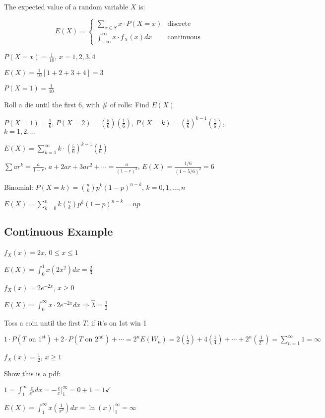 \begin{definition}
The expected value of a random variable $X$ is:

\[E(X) = \begin{cases}
\sum_{x \in S} x \cdot P(X = x) & \text{discrete} \\
\int_{-\infty}^{\infty} x \cdot f_X(x) dx & \text{continuous}
\end{cases}\]
\end{definition}

\begin{example}
$P(X = x) = \frac{1}{10}$, $x = 1, 2, 3, 4$

$E(X) = \frac{1}{10}[1 + 2 + 3 + 4] = 3$

$P(X = 1) = \frac{1}{10}$
\end{example}

Roll a die until the first 6, with $\#$ of rolls: Find $E(X)$

$P(X = 1) = \frac{1}{6}$, $P(X = 2) = \left(\frac{5}{6}\right)\left(\frac{1}{6}\right)$, $P(X = k) = \left(\frac{5}{6}\right)^{k-1} \left(\frac{1}{6}\right)$, $k = 1, 2, \ldots$

$E(X) = \sum_{k=1}^{\infty} k \cdot \left(\frac{5}{6}\right)^{k-1} \left(\frac{1}{6}\right)$

$\sum ar^k = \frac{a}{1-r}$, $a + 2ar + 3ar^2 + \cdots = \frac{a}{(1-r)^2}$, $E(X) = \frac{1/6}{(1-5/6)^2} = 6$

Binomial: $P(X = k) = \binom{n}{k} p^k (1-p)^{n-k}$, $k = 0, 1, \ldots, n$

$E(X) = \sum_{k=0}^n k \binom{n}{k} p^k (1-p)^{n-k} = np$

\subsection{Continuous Example}

$f_X(x) = 2x$, $0 \leq x \leq 1$

$E(X) = \int_0^1 x(2x^2) dx = \frac{2}{3}$

$f_X(x) = 2e^{-2x}$, $x \geq 0$

$E(X) = \int_0^{\infty} x \cdot 2e^{-2x} dx \Rightarrow \hat{\lambda} = \frac{1}{2}$

Toss a coin until the first $T$, if it's on 1st win 1

$1 \cdot P(T \text{ on } 1^{\text{st}}) + 2 \cdot P(T \text{ on } 2^{\text{nd}}) + \cdots = 2^n E(W_n) = 2\left(\frac{1}{2}\right) + 4\left(\frac{1}{4}\right) + \cdots + 2^n \left(\frac{1}{2^n}\right) = \sum_{n=1}^{\infty} 1 = \infty$

$f_X(x) = \frac{1}{2}$, $x \geq 1$

Show this is a pdf:

$1 = \int_1^{\infty} \frac{c}{x^2} dx = -\frac{c}{x} \Big|_1^{\infty} = 0 + 1 = 1 \checkmark$

$E(X) = \int_1^{\infty} x \left(\frac{1}{x^2}\right) dx = \ln(x) \Big|_1^{\infty} = \infty$
